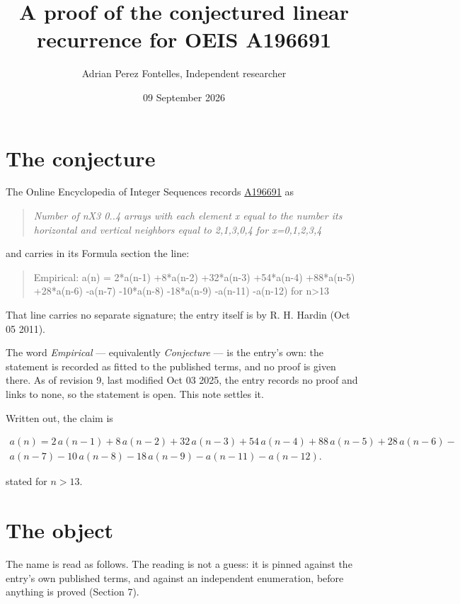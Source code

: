 \documentclass[11pt]{article}
\title{A proof of the conjectured linear recurrence for OEIS A196691}
\author{Adrian Perez Fontelles, Independent researcher}
\date{09 September 2026}
\theoremstyle{definition}
\begin{document}
\maketitle
\section{The conjecture}

The Online Encyclopedia of Integer Sequences records \href{https://oeis.org/A196691}{A196691} as

\begin{quote}\itshape Number of nX3 0..4 arrays with each element x equal to the number its horizontal and vertical neighbors equal to 2,1,3,0,4 for x=0,1,2,3,4\end{quote}

and carries in its Formula section the line:

\begin{quote}\ttfamily Empirical: a(n) = 2*a(n-1) +8*a(n-2) +32*a(n-3) +54*a(n-4) +88*a(n-5) +28*a(n-6) -a(n-7) -10*a(n-8) -18*a(n-9) -a(n-11) -a(n-12) for n>13\end{quote}

That line carries no separate signature; the entry itself is by R. H. Hardin (Oct 05 2011).

The word {\itshape Empirical} --- equivalently {\itshape Conjecture} --- is the entry's own: the statement is recorded as fitted to the published terms, and no proof is given there. As of revision 9, last modified Oct 03 2025, the entry records no proof and links to none, so the statement is open. This note settles it.

Written out, the claim is

\begin{multline*} a(n) = 2\,a(n-1) + 8\,a(n-2) + 32\,a(n-3) + 54\,a(n-4) + 88\,a(n-5) + 28\,a(n-6) - \\ a(n-7) - 10\,a(n-8) - 18\,a(n-9) - a(n-11) - a(n-12). \end{multline*}

stated for $n > 13$.

\section{The object}

The name is read as follows. The reading is not a guess: it is pinned against the entry's own published terms, and against an independent enumeration, before anything is proved (Section 7).
\end{document}
